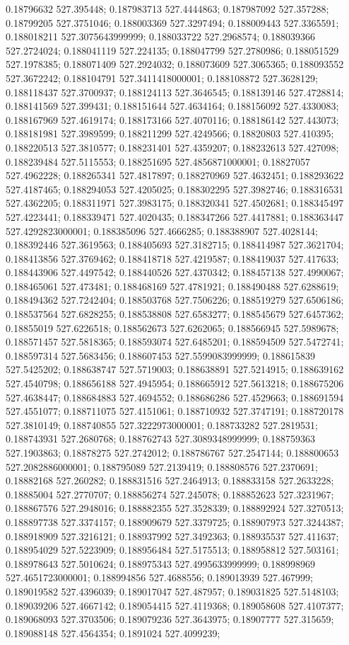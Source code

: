 0.18796632 527.395448; 0.187983713 527.4444863; 0.187987092 527.357288; 0.18799205 527.3751046; 0.188003369 527.3297494; 0.188009443 527.3365591; 0.188018211 527.3075643999999; 0.188033722 527.2968574; 0.188039366 527.2724024; 0.188041119 527.224135; 0.188047799 527.2780986; 0.188051529 527.1978385; 0.188071409 527.2924032; 0.188073609 527.3065365; 0.188093552 527.3672242; 0.188104791 527.3411418000001; 0.188108872 527.3628129; 0.188118437 527.3700937; 0.188124113 527.3646545; 0.188139146 527.4728814; 0.188141569 527.399431; 0.188151644 527.4634164; 0.188156092 527.4330083; 0.188167969 527.4619174; 0.188173166 527.4070116; 0.188186142 527.443073; 0.188181981 527.3989599; 0.188211299 527.4249566; 0.18820803 527.410395; 0.188220513 527.3810577; 0.188231401 527.4359207; 0.188232613 527.427098; 0.188239484 527.5115553; 0.188251695 527.4856871000001; 0.18827057 527.4962228; 0.188265341 527.4817897; 0.188270969 527.4632451; 0.188293622 527.4187465; 0.188294053 527.4205025; 0.188302295 527.3982746; 0.188316531 527.4362205; 0.188311971 527.3983175; 0.188320341 527.4502681; 0.188345497 527.4223441; 0.188339471 527.4020435; 0.188347266 527.4417881; 0.188363447 527.4292823000001; 0.188385096 527.4666285; 0.188388907 527.4028144; 0.188392446 527.3619563; 0.188405693 527.3182715; 0.188414987 527.3621704; 0.188413856 527.3769462; 0.188418718 527.4219587; 0.188419037 527.417633; 0.188443906 527.4497542; 0.188440526 527.4370342; 0.188457138 527.4990067; 0.188465061 527.473481; 0.188468169 527.4781921; 0.188490488 527.6288619; 0.188494362 527.7242404; 0.188503768 527.7506226; 0.188519279 527.6506186; 0.188537564 527.6828255; 0.188538808 527.6583277; 0.188545679 527.6457362; 0.18855019 527.6226518; 0.188562673 527.6262065; 0.188566945 527.5989678; 0.188571457 527.5818365; 0.188593074 527.6485201; 0.188594509 527.5472741; 0.188597314 527.5683456; 0.188607453 527.5599083999999; 0.188615839 527.5425202; 0.188638747 527.5719003; 0.188638891 527.5214915; 0.188639162 527.4540798; 0.188656188 527.4945954; 0.188665912 527.5613218; 0.188675206 527.4638447; 0.188684883 527.4694552; 0.188686286 527.4529663; 0.188691594 527.4551077; 0.188711075 527.4151061; 0.188710932 527.3747191; 0.188720178 527.3810149; 0.188740855 527.3222973000001; 0.188733282 527.2819531; 0.188743931 527.2680768; 0.188762743 527.3089348999999; 0.188759363 527.1903863; 0.18878275 527.2742012; 0.188786767 527.2547144; 0.188800653 527.2082886000001; 0.188795089 527.2139419; 0.188808576 527.2370691; 0.18882168 527.260282; 0.188831516 527.2464913; 0.188833158 527.2633228; 0.18885004 527.2770707; 0.188856274 527.245078; 0.188852623 527.3231967; 0.188867576 527.2948016; 0.188882355 527.3528339; 0.188892924 527.3270513; 0.188897738 527.3374157; 0.188909679 527.3379725; 0.188907973 527.3244387; 0.188918909 527.3216121; 0.188937992 527.3492363; 0.188935537 527.411637; 0.188954029 527.5223909; 0.188956484 527.5175513; 0.188958812 527.503161; 0.188978643 527.5010624; 0.188975343 527.4995633999999; 0.188998969 527.4651723000001; 0.188994856 527.4688556; 0.189013939 527.467999; 0.189019582 527.4396039; 0.189017047 527.487957; 0.189031825 527.5148103; 0.189039206 527.4667142; 0.189054415 527.4119368; 0.189058608 527.4107377; 0.189068093 527.3703506; 0.189079236 527.3643975; 0.18907777 527.315659; 0.189088148 527.4564354; 0.1891024 527.4099239; 